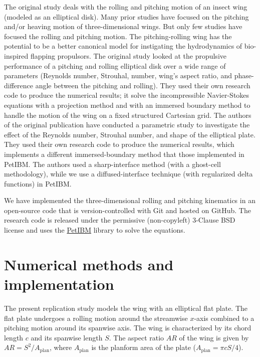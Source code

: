 The original study\supercite{li_dong_2016} deals with the rolling and pitching motion of an insect wing (modeled as an elliptical disk).
Many prior studies have focused on the pitching and/or heaving motion of three-dimensional wings.
But only few studies have focused the rolling and pitching motion.
The pitching-rolling wing has the potential to be a better canonical model for instigating the hydrodynamics of bio-inspired flapping propulsors.
The original study looked at the propulsive performance of a pitching and rolling elliptical disk over a wide range of parameters (Reynolds number, Strouhal, number, wing's aspect ratio, and phase-difference angle between the pitching and rolling).
They used their own research code to produce the numerical results; it solve the incompressible Navier-Stokes equations with a projection method and with an immersed boundary method to handle the motion of the wing on a fixed structured Cartesian grid.
The authors of the original publication have conducted a parametric study to investigate the effect of the Reynolds number, Strouhal number, and shape of the elliptical plate.
They used their own research code to produce the numerical results, which implements a different immersed-boundary method that those implemented in PetIBM.
The authors used a sharp-interface method (with a ghost-cell methodology), while we use a diffused-interface technique (with regularized delta functions) in PetIBM.

We have implemented the three-dimensional rolling and pitching kinematics in an open-source code that is version-controlled with Git and hosted on GitHub.
The research code is released under the permissive (non-copyleft) 3-Clause BSD license and uses the \href{https://github.com/barbagroup/PetIBM}{PetIBM} library\supercite{chuang_et_al_2018} to solve the equations.

\section{Numerical methods and implementation}

The present replication study models the wing with an elliptical flat plate.
The flat plate undergoes a rolling motion around the streamwise $x$-axis combined to a pitching motion around its spanwise axis.
The wing is characterized by its chord length $c$ and its spanwise length $S$.
The aspect ratio $AR$ of the wing is given by $AR = S^2 / A_\text{plan}$, where $A_\text{plan}$ is the planform area of the plate ($A_\text{plan} = \pi c S / 4$).

